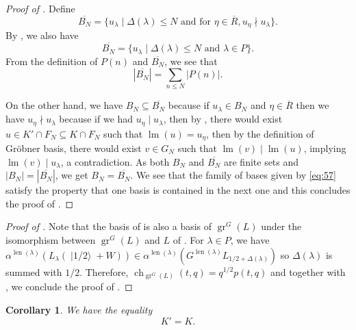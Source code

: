 \documentclass[a4paper, 12pt, reqno]{amsart}
\newtheorem{corollary}[theorem]{Corollary}
\theoremstyle{remark}
\numberwithin{equation}{subsection}
\DeclareMathOperator{\gr}{gr}
\DeclareMathOperator{\ch}{ch}
\DeclareMathOperator{\lm}{lm}
\DeclareMathOperator{\len}{len}
\DeclareMathOperator{\vachalf}{|1/2\rangle}
\begin{document}
\begin{proof}[Proof of ]
  Define
  \begin{equation*}
    \overline{B_N} = \{u_\lambda \mid \Delta(\lambda) \le N\text{ and for }\eta \in \overline{R}, u_\eta \nmid u_\lambda\}.
  \end{equation*}
  By , we also have
  \begin{equation*}
    \overline{B_N} = \{u_\lambda \mid \Delta(\lambda) \le N\text{ and }\lambda \in P\}.
  \end{equation*}
  From the definition of $P(n)$ and $\overline{B_N}$, we see that
  \begin{equation*}
    |\overline{B_N}| = \sum_{n \le N}|P(n)|.
  \end{equation*}
  
  On the other hand, we have $B_N \subseteq \overline{B_N}$ because if $u_\lambda \in B_N$ and $\eta \in \overline{R}$ then we have $u_\eta \nmid u_\lambda$ because if we had $u_\eta \mid u_\lambda$, then by , there would exist $u \in K' \cap F_N \subseteq K \cap F_N$ such that $\lm(u) = u_\eta$, then by the definition of Gr\"{o}bner basis, there would exist $v \in G_N$ such that $\lm(v) \mid \lm(u)$, implying $\lm(v) \mid u_\lambda$, a contradiction.
  As both $B_N$ and $\overline{B_N}$ are finite sets and $|B_N| = |\overline{B_N}|$, we get $B_N = \overline{B_N}$.
  We see that the family of bases given by \eqref{eq:57} satisfy the property that one basis is contained in the next one and this concludes the proof of .
\end{proof}

\begin{proof}[Proof of ]
  Note that the basis of  is also a basis of $\gr^G(L)$ under the isomorphism between $\gr^G(L)$ and $L$ of .
  For $\lambda \in P$, we have $\alpha^{\len(\lambda)}(L_\lambda(\vachalf + W)) \in \alpha^{\len(\lambda)}(G^{\len(\lambda)}L_{1/2 + \Delta(\lambda)})$ so $\Delta(\lambda)$ is summed with $1/2$.
  Therefore, $\ch_{\gr^G(L)}(t, q) = q^{1/2}p(t, q)$ and together with , we conclude the proof of .
\end{proof}

\begin{corollary}
  \label{crl:3}
  We have the equality
  \begin{equation*}
    K' = K.
  \end{equation*}
\end{corollary}
\end{document}
